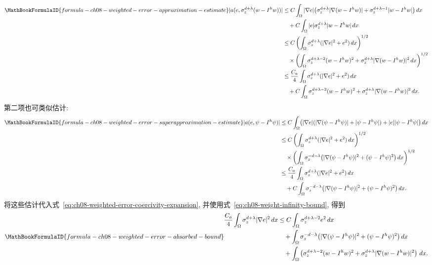 \begin{Proof}
\begin{align*}
\MathBookFormulaID{formula-ch08-weighted-error-approximation-estimate}
|a(e,\sigma_z^{d+\lambda}(w-I^hw))|
&\leq C\int_\Omega|\nabla e|
\bigl(\sigma_z^{d+\lambda}|\nabla(w-I^hw)|
+\sigma_z^{d+\lambda-1}|w-I^hw|\bigr)\,dx\\
&\quad+C\int_\Omega|e|\sigma_z^{d+\lambda}|w-I^hw|\,dx\\
&\leq C\left(\int_\Omega\sigma_z^{d+\lambda}(|\nabla e|^2+e^2)\,dx\right)^{1/2}\\
&\quad\times\left(\int_\Omega\sigma_z^{d+\lambda-2}(w-I^hw)^2
+\sigma_z^{d+\lambda}|\nabla(w-I^hw)|^2\,dx\right)^{1/2}\\
&\leq\frac{C_a}{4}\int_\Omega\sigma_z^{d+\lambda}(|\nabla e|^2+e^2)\,dx\\
&\quad+C\int_\Omega\sigma_z^{d+\lambda-2}(w-I^hw)^2
+\sigma_z^{d+\lambda}|\nabla(w-I^hw)|^2\,dx.
\end{align*}
第二项也可类似估计:
\begin{align*}
\MathBookFormulaID{formula-ch08-weighted-error-superapproximation-estimate}
|a(e,\psi-I^h\psi)|
&\leq C\int_\Omega\bigl(|\nabla e|(|\nabla(\psi-I^h\psi)|+|\psi-I^h\psi|)
+|e||\psi-I^h\psi|\bigr)\,dx\\
&\leq C\left(\int_\Omega\sigma_z^{d+\lambda}(|\nabla e|^2+e^2)\,dx\right)^{1/2}\\
&\quad\times\left(\int_\Omega\sigma_z^{-d-\lambda}
\bigl(|\nabla(\psi-I^h\psi)|^2+(\psi-I^h\psi)^2\bigr)\,dx\right)^{1/2}\\
&\leq\frac{C_a}{4}\int_\Omega\sigma_z^{d+\lambda}(|\nabla e|^2+e^2)\,dx\\
&\quad+C\int_\Omega\sigma_z^{-d-\lambda}
\bigl(|\nabla(\psi-I^h\psi)|^2+(\psi-I^h\psi)^2\bigr)\,dx.
\end{align*}
将这些估计代入式~\eqref{eq:ch08-weighted-error-coercivity-expansion}, 并使用式~\eqref{eq:ch08-weight-infinity-bound}, 得到
\begin{equation}
\MathBookFormulaID{formula-ch08-weighted-error-absorbed-bound}
\label{eq:ch08-weighted-error-absorbed-bound}
\begin{aligned}
\frac{C_a}{4}\int_\Omega\sigma_z^{d+\lambda}|\nabla e|^2\,dx
&\leq C\int_\Omega\sigma_z^{d+\lambda-2}e^2\,dx\\
&\quad+\int_\Omega\sigma_z^{-d-\lambda}
\bigl(|\nabla(\psi-I^h\psi)|^2+(\psi-I^h\psi)^2\bigr)\,dx
\\
&\quad+\int_\Omega\left(\sigma_z^{d+\lambda-2}(w-I^hw)^2
+\sigma_z^{d+\lambda}|\nabla(w-I^hw)|^2\right)\,dx.
\end{aligned}

\end{equation}
\end{Proof}
